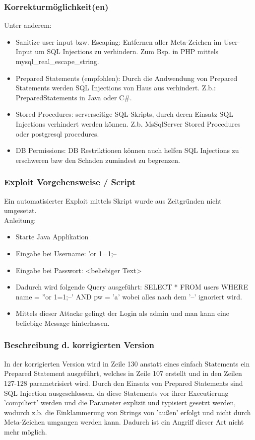 \documentclass[12pt,a4paper,titlepage,oneside]{scrartcl}
\begin{document}
\subsubsection{Korrekturmöglichkeit(en)}
\noindent
Unter anderem:
\begin{itemize}
\item Sanitize user input bzw. Escaping: Entfernen aller Meta-Zeichen im User-Input um SQL Injections zu verhindern. Zum Bsp. in PHP mittels mysql\_real\_escape\_string. 
\item Prepared Statements (empfohlen): Durch die Andwendung von Prepared Statements werden SQL Injections von Haus aus verhindert. Z.b.: PreparedStatements in Java oder C\#.
\item Stored Procedures: serverseitige SQL-Skripts, durch deren Einsatz SQL Injections verhindert werden können. Z.b. MsSqlServer Stored Procedures oder postgresql procedures.
\item DB Permissions: DB Restriktionen können auch helfen SQL Injections zu erschweren bzw den Schaden zumindest zu begrenzen.
\end{itemize}

\subsubsection{Exploit Vorgehensweise / Script}
\noindent
Ein automatisierter Exploit mittels Skript wurde aus Zeitgründen nicht umgesetzt. \\
Anleitung:
\begin{itemize}
\item Starte Java Applikation
\item Eingabe bei Username: 'or 1=1;--
\item Eingabe bei Passwort: <beliebiger Text>
\item Dadurch wird folgende Query ausgeführt: SELECT * FROM users WHERE name = ''or 1=1;--' AND pw = 'a' wobei alles nach dem '--' ignoriert wird.
\item Mittels dieser Attacke gelingt der Login als admin und man kann eine beliebige Message hinterlassen.
\end{itemize}

\subsubsection{Beschreibung d. korrigierten Version}
\noindent
In der korrigierten Version wird in Zeile 130 anstatt eines einfach Statements ein Prepared Statement ausgeführt, welches in Zeile 107 erstellt und in den Zeilen 127-128 parametrisiert wird.
Durch den Einsatz von Prepared Statements sind SQL Injection ausgeschlossen, da diese Statements vor ihrer Executierung 'compiliert' werden und die Parameter explizit und typisiert gesetzt werden, wodurch z.b. die Einklammerung von Strings von 'außen' erfolgt und nicht durch Meta-Zeichen umgangen werden kann. 
Dadurch ist ein Angriff dieser Art nicht mehr möglich.
\end{document}
